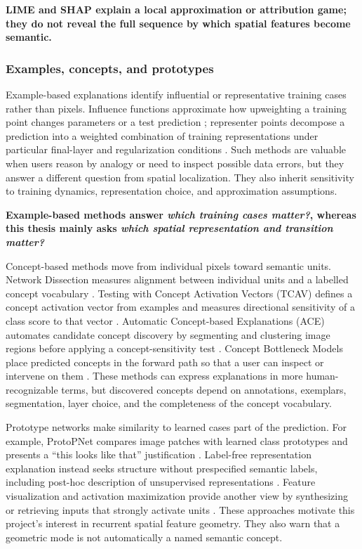 \textbf{LIME and SHAP explain a local approximation or attribution game; they
do not reveal the full sequence by which spatial features become semantic.}

\subsubsection{Examples, concepts, and prototypes}

Example-based explanations identify influential or representative training
cases rather than pixels. Influence functions approximate how upweighting a
training point changes parameters or a test prediction
\cite{koh2017influence}; representer points decompose a prediction into a
weighted combination of training representations under particular final-layer
and regularization conditions \cite{yeh2018representer}. Such methods are
valuable when users reason by analogy or need to inspect possible data errors,
but they answer a different question from spatial localization. They also
inherit sensitivity to training dynamics, representation choice, and
approximation assumptions.

\textbf{Example-based methods answer \emph{which training cases matter?},
whereas this thesis mainly asks \emph{which spatial representation and
transition matter?}}

Concept-based methods move from individual pixels toward semantic units.
Network Dissection measures alignment between individual units and a labelled
concept vocabulary \cite{bau2017networkdissection}. Testing with Concept
Activation Vectors (TCAV) defines a concept
activation vector from examples and measures directional sensitivity of a
class score to that vector \cite{kim2018tcav}. Automatic Concept-based
Explanations (ACE) automates candidate concept
discovery by segmenting and clustering image regions before applying a
concept-sensitivity test \cite{ghorbani2019ace}. Concept Bottleneck Models
place predicted concepts in the forward path so that a user can inspect or
intervene on them \cite{koh2020conceptbottleneck}. These methods can express
explanations in more human-recognizable terms, but discovered concepts depend
on annotations, exemplars, segmentation, layer choice, and the completeness of
the concept vocabulary.

Prototype networks make similarity to learned cases part of the prediction.
For example, ProtoPNet compares image patches with learned class prototypes
and presents a ``this looks like that'' justification
\cite{chen2019protopnet}. Label-free representation explanation instead seeks
structure without prespecified semantic labels, including post-hoc description
of unsupervised representations \cite{crabbe2022labelfree}. Feature
visualization and activation maximization provide another view by synthesizing
or retrieving inputs that strongly activate units
\cite{yosinski2015deepvis}. These approaches motivate this project's interest
in recurrent spatial feature geometry. They also warn that a geometric mode is
not automatically a named semantic concept.

